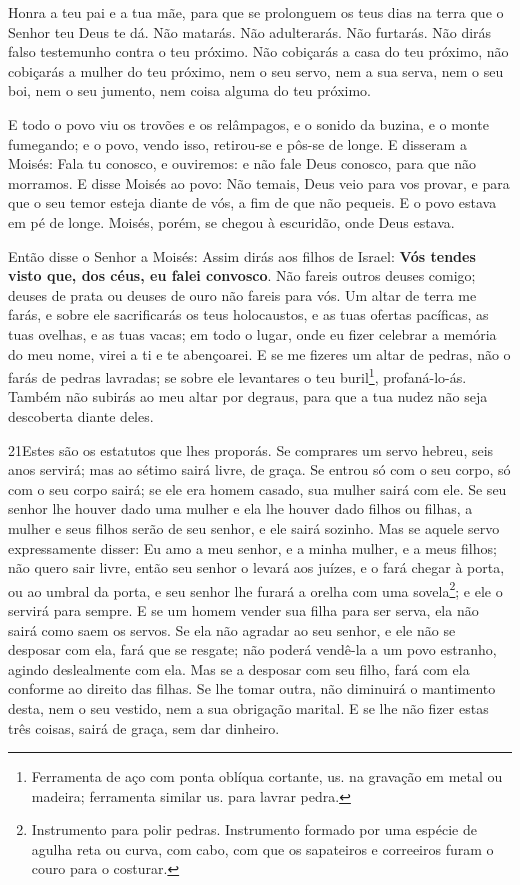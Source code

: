 Honra a teu pai e a tua mãe, para que se prolonguem os teus dias
na terra que o Senhor teu Deus te dá. Não matarás. Não
adulterarás. Não furtarás. Não dirás falso testemunho
contra o teu próximo. Não cobiçarás a casa do teu próximo,
não cobiçarás a mulher do teu próximo, nem o seu servo, nem a sua
serva, nem o seu boi, nem o seu jumento, nem coisa alguma do teu
próximo.

E todo o povo viu os trovões e os relâmpagos, e o sonido da
buzina, e o monte fumegando; e o povo, vendo isso, retirou-se e
pôs-se de longe. E disseram a Moisés: Fala tu conosco, e
ouviremos: e não fale Deus conosco, para que não morramos. E
disse Moisés ao povo: Não temais, Deus veio para vos provar, e para
que o seu temor esteja diante de vós, a fim de que não pequeis.
E o povo estava em pé de longe. Moisés, porém, se chegou à
escuridão, onde Deus estava.

Então disse o Senhor a Moisés: Assim dirás aos filhos de Israel:
\textbf{Vós tendes visto que, dos céus, eu falei convosco}.
Não fareis outros deuses comigo; deuses de prata ou deuses de
ouro não fareis para vós. Um altar de terra me farás, e sobre
ele sacrificarás os teus holocaustos, e as tuas ofertas pacíficas,
as tuas ovelhas, e as tuas vacas; em todo o lugar, onde eu fizer
celebrar a memória do meu nome, virei a ti e te abençoarei. E
se me fizeres um altar de pedras, não o farás de pedras lavradas; se
sobre ele levantares o teu buril\footnote{Ferramenta de aço com
ponta oblíqua cortante, us. na gravação em metal ou madeira;
ferramenta similar us. para lavrar pedra.}, profaná-lo-ás.
Também não subirás ao meu altar por degraus, para que a tua
nudez não seja descoberta diante deles.

\medskip

\lettrine{21} Estes são os estatutos que lhes proporás. Se
comprares um servo hebreu, seis anos servirá; mas ao sétimo sairá
livre, de graça. Se entrou só com o seu corpo, só com o seu
corpo sairá; se ele era homem casado, sua mulher sairá com ele.
Se seu senhor lhe houver dado uma mulher e ela lhe houver dado
filhos ou filhas, a mulher e seus filhos serão de seu senhor, e ele
sairá sozinho. Mas se aquele servo expressamente disser: Eu amo
a meu senhor, e a minha mulher, e a meus filhos; não quero sair
livre, então seu senhor o levará aos juízes, e o fará chegar à
porta, ou ao umbral da porta, e seu senhor lhe furará a orelha com
uma sovela\footnote{Instrumento para polir pedras. Instrumento
formado por uma espécie de agulha reta ou curva, com cabo, com que
os sapateiros e correeiros furam o couro para o costurar.}; e ele o
servirá para sempre. E se um homem vender sua filha para ser
serva, ela não sairá como saem os servos. Se ela não agradar ao
seu senhor, e ele não se desposar com ela, fará que se resgate; não
poderá vendê-la a um povo estranho, agindo deslealmente com ela.
Mas se a desposar com seu filho, fará com ela conforme ao
direito das filhas. Se lhe tomar outra, não diminuirá o
mantimento desta, nem o seu vestido, nem a sua obrigação marital.
E se lhe não fizer estas três coisas, sairá de graça, sem dar
dinheiro.

